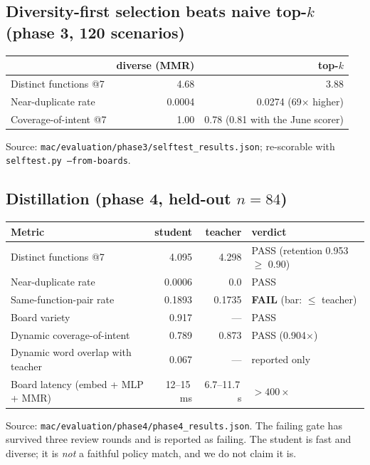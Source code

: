 \documentclass[11pt]{article}
\newcommand{\code}[1]{\texttt{#1}}
\newcommand{\file}[1]{\texttt{\small #1}}
\begin{document}
\subsection{Diversity-first selection beats naive top-$k$ (phase 3, 120 scenarios)}
\begin{center}
\begin{tabular}{@{}lrr@{}}
\toprule
 & \textbf{diverse (MMR)} & \textbf{top-$k$} \\ \midrule
Distinct functions @7 & 4.68 & 3.88 \\
Near-duplicate rate & 0.0004 & 0.0274 (69$\times$ higher) \\
Coverage-of-intent @7 & 1.00 & 0.78 (0.81 with the June scorer) \\
\bottomrule
\end{tabular}
\end{center}
Source: \file{mac/evaluation/phase3/selftest\_results.json}; re-scorable with
\code{selftest.py --from-boards}.

\subsection{Distillation (phase 4, held-out $n=84$)}
\begin{center}
\begin{tabular}{@{}lrrl@{}}
\toprule
\textbf{Metric} & \textbf{student} & \textbf{teacher} & \textbf{verdict} \\ \midrule
Distinct functions @7 & 4.095 & 4.298 & PASS (retention 0.953 $\ge$ 0.90) \\
Near-duplicate rate & 0.0006 & 0.0 & PASS \\
Same-function-pair rate & 0.1893 & 0.1735 & \textbf{FAIL} (bar: $\le$ teacher) \\
Board variety & 0.917 & --- & PASS \\
Dynamic coverage-of-intent & 0.789 & 0.873 & PASS (0.904$\times$) \\
Dynamic word overlap with teacher & 0.067 & --- & reported only \\
Board latency (embed + MLP + MMR) & 12--15\,ms & 6.7--11.7\,s & ${>}400\times$ \\
\bottomrule
\end{tabular}
\end{center}
Source: \file{mac/evaluation/phase4/phase4\_results.json}. The failing gate has
survived three review rounds and is reported as failing. The student is fast and
diverse; it is \emph{not} a faithful policy match, and we do not claim it is.
\end{document}
